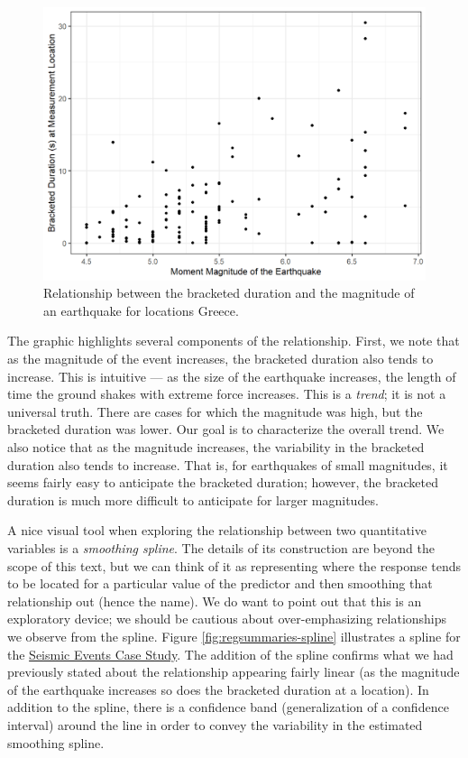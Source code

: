 \documentclass[
]{book}
\theoremstyle{plain}
\theoremstyle{mydefn}
\theoremstyle{myexmpl}
\theoremstyle{remark}
\begin{document}
\begin{figure}

{\centering \includegraphics[width=0.8\linewidth]{./Images/regsummaries-magnitude-1} 

}

\caption{Relationship between the bracketed duration and the magnitude of an earthquake for locations Greece.}\label{fig:regsummaries-magnitude}
\end{figure}

The graphic highlights several components of the relationship. First, we note that as the magnitude of the event increases, the bracketed duration also tends to increase. This is intuitive --- as the size of the earthquake increases, the length of time the ground shakes with extreme force increases. This is a \emph{trend}; it is not a universal truth. There are cases for which the magnitude was high, but the bracketed duration was lower. Our goal is to characterize the overall trend. We also notice that as the magnitude increases, the variability in the bracketed duration also tends to increase. That is, for earthquakes of small magnitudes, it seems fairly easy to anticipate the bracketed duration; however, the bracketed duration is much more difficult to anticipate for larger magnitudes.

A nice visual tool when exploring the relationship between two quantitative variables is a \emph{smoothing spline}. The details of its construction are beyond the scope of this text, but we can think of it as representing where the response tends to be located for a particular value of the predictor and then smoothing that relationship out (hence the name). We do want to point out that this is an exploratory device; we should be cautious about over-emphasizing relationships we observe from the spline. Figure \ref{fig:regsummaries-spline} illustrates a spline for the \protect\hyperlink{CaseGreece}{Seismic Events Case Study}. The addition of the spline confirms what we had previously stated about the relationship appearing fairly linear (as the magnitude of the earthquake increases so does the bracketed duration at a location). In addition to the spline, there is a confidence band (generalization of a confidence interval) around the line in order to convey the variability in the estimated smoothing spline.
\end{document}
